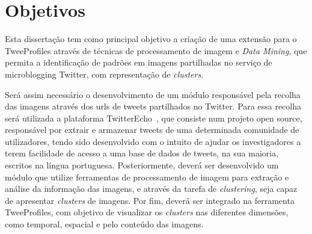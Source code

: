 
\section{Objetivos} \label{sec:object}

Esta dissertação tem como principal objetivo a criação de uma extensão para o TweeProfiles através de técnicas de processamento de imagem e \textit{Data Mining}, que permita a identificação de padrões em imagens partilhadas no serviço de microblogging Twitter, com representação de \textit{clusters}.


Será assim necessário o desenvolvimento de um módulo responsável pela recolha das imagens através dos urls de tweets partilhados no Twitter. Para essa recolha será utilizada a plataforma TwitterEcho~\cite{Boanjak2012}, que consiste num projeto open source, responsável por extrair e armazenar tweets de uma determinada comunidade de utilizadores, tendo sido desenvolvido com o intuito de ajudar os investigadores a terem facilidade de acesso a uma base de dados de tweets, na sua maioria, escritos na língua portuguesa.
Posteriormente, deverá ser desenvolvido um módulo que utilize ferramentas de processamento de imagem para extração e análise da informação das imagens, e através da tarefa de \textit{clustering}, seja capaz de apresentar \textit{clusters} de imagens.
Por fim, deverá ser integrado na ferramenta TweeProfiles, com objetivo de visualizar os \textit{clusters} nas diferentes dimensões, como temporal, espacial e pelo conteúdo das imagens.

